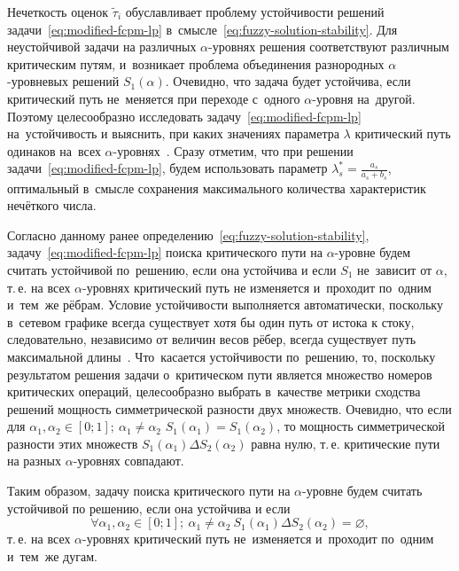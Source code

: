 Нечеткость оценок $\tilde{\tau}_i$ обуславливает проблему устойчивости решений задачи~\eqref{eq:modified-fcpm-lp} в~смысле~\eqref{eq:fuzzy-solution-stability}. Для неустойчивой задачи на различных $\alpha $-уровнях решения соответствуют различным критическим путям, и~возникает проблема объединения разнородных $\alpha$-уровневых решений $S_1\left(\alpha \right)$. Очевидно, что задача будет устойчива, если критический путь не~меняется при переходе с~одного $\alpha$-уровня на~другой. Поэтому целесообразно исследовать задачу~\eqref{eq:modified-fcpm-lp} на~устойчивость и выяснить, при каких значениях параметра $\lambda$ критический путь одинаков на~всех $\alpha$-уровнях~\cite{Vorontsov_VSTU}. Сразу отметим, что при решении задачи~\eqref{eq:modified-fcpm-lp}, будем использовать параметр $\displaystyle \lambda_{s}^{*}=\frac{a_s}{a_s+b_s}$, оптимальный в~смысле сохранения максимального количества характеристик нечёткого числа.

Согласно данному ранее определению~\eqref{eq:fuzzy-solution-stability}, задачу~\eqref{eq:modified-fcpm-lp} поиска критического пути на $\alpha$-уровне будем считать устойчивой по~решению, если она устойчива и если $S_1$ не~зависит от $\alpha$, т.\,е. на всех $\alpha$-уровнях критический путь не изменяется и~проходит по~одним и~тем~же рёбрам. Условие устойчивости выполняется автоматически, поскольку в~сетевом графике всегда существует хотя бы один путь от истока к стоку, следовательно, независимо от величин весов рёбер, всегда существует путь максимальной длины~\cite{Kormen}. Что~касается устойчивости по~решению, то, поскольку результатом решения задачи о~критическом пути является множество номеров критических операций, целесообразно выбрать в~качестве метрики сходства решений мощность симметрической разности двух множеств. Очевидно, что если для $\alpha_1, \alpha_2 \in \left[ 0;1 \right];\ \alpha_1\ne \alpha_2$ $S_1\left( \alpha_1 \right)=S_1\left(\alpha_2 \right)$, то мощность симметрической разности этих множеств $S_1\left( \alpha_1 \right)\Delta S_2\left(\alpha_2 \right)$ равна нулю, т.\,е. критические пути на разных $\alpha$-уровнях совпадают.

Таким образом, задачу поиска критического пути на $\alpha $-уровне будем считать устойчивой по решению, если она устойчива и если 
\begin{equation}
\label{eq:modified-cpm-lp-stability}
  \forall \alpha_1, \alpha_2\in \left[ 0;1 \right];\ \alpha_1\ne \alpha_2\ S_1\left(\alpha_1 \right)\Delta S_2\left(\alpha_2 \right)=\varnothing,
\end{equation}
т.\,е. на всех $\alpha $-уровнях критический путь не~изменяется и~проходит по~одним и~тем~же дугам. 

